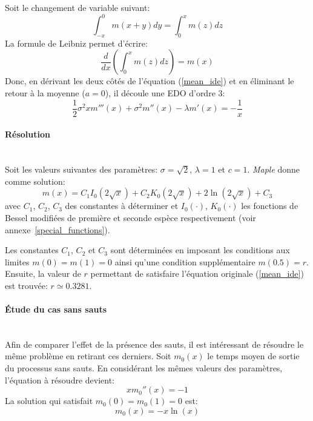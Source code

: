 Soit le changement de variable suivant:
\begin{equation}\label{variable_change_mean}
    \int_{-x}^0m(x+y)dy=\int_0^x m(z)dz
\end{equation}
La formule de Leibniz permet d'écrire:
\[
\frac{d}{dx}\left(\int_0^x m(z)dz\right)=m(x)
\]
Donc, en dérivant les deux côtés de l'équation (\ref{mean_ide}) et en éliminant le retour à la moyenne ($a=0$), il découle une \acs{EDO} d'ordre 3:
\begin{equation}\label{mean_3rd_order}
    \frac{1}{2}\sigma^2xm'''(x)+\sigma^2m''(x)-\lambda m'(x)=-\frac{1}{x}
\end{equation}

\paragraph{Résolution}\phantom{}\\
Soit les valeurs suivantes des paramètres: $\sigma=\sqrt{2}$, $\lambda=1$ et $c=1$. \textit{Maple} donne comme solution:
\begin{equation}\label{sol_mean_with_jumps}
    m(x)=C_1I_0(2\sqrt{x})+C_2K_0(2\sqrt{x})+2\ln(2\sqrt{x})+C_3
\end{equation}
avec $C_1$, $C_2$, $C_3$ des constantes à déterminer et $I_0(\cdot)$, $K_0(\cdot)$ les fonctions de Bessel modifiées de première et seconde espèce respectivement (voir annexe~\ref{special_functions}).

Les constantes $C_1$, $C_2$ et $C_3$ sont déterminées en imposant les conditions aux limites $m(0)=m(1)=0$ ainsi qu'une condition supplémentaire $m(0.5)=r$. Ensuite, la valeur de $r$ permettant de satisfaire l'équation originale (\ref{mean_ide}) est trouvée: $r\simeq0.3281$.

\paragraph{Étude du cas sans sauts}\phantom{}\\
Afin de comparer l'effet de la présence des sauts, il est intéressant de résoudre le même problème en retirant ces derniers. Soit $m_0(x)$ le temps moyen de sortie du processus sans sauts. En considérant les mêmes valeurs des paramètres, l'équation à résoudre devient:
\begin{equation}\label{mean_3rd_order_without_jumps}
    xm_0''(x)=-1
\end{equation}
La solution qui satisfait $m_0(0)=m_0(1)=0$ est:
\begin{equation}\label{sol_mean_with_0_jumps}
    m_0(x)=-x\ln(x)
\end{equation}

